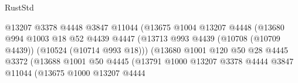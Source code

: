\begin{lexlean}{RustStd}
\begin{coremodule}
                                                @13207
                                                @3378
                                                @4448
                                                @3847
                                                @11044
                                                (@13675
                                                  @1004
                                                  @13207
                                                  @4448
                                                  (@13680
                                                    @994
                                                    @1003
                                                    @18
                                                    @52
                                                    @4439
                                                    @4447
                                                    (@13713
                                                      @993
                                                      @4439
                                                      (@10708 (@10709 @4439))
                                                      (@10524 (@10714 @993 @18)))
                                                    (@13680
                                                      @1001
                                                      @120
                                                      @50
                                                      @28
                                                      @4445
                                                      @3372
                                                      (@13688
                                                        @1001
                                                        @50
                                                        @4445
                                                        (@13791
                                                          @1000
                                                          @13207
                                                          @3378
                                                          @4444
                                                          @3847
                                                          @11044
                                                          (@13675
                                                            @1000
                                                            @13207
                                                            @4444

\end{coremodule}
\end{lexlean}
